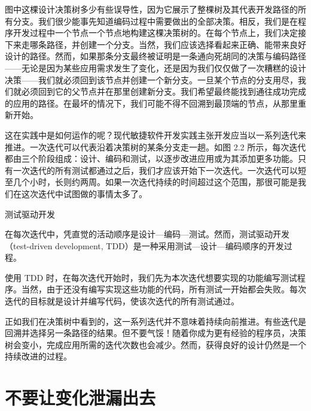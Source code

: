 图中这棵设计决策树多少有些误导性，因为它展示了整棵树及其代表开发路径的所有分支。我们很少能事先知道编码过程中需要做出的全部决策。相反，我们是在程序开发过程中一个节点一个节点地构建这棵决策树的。在每个节点上，我们决定接下来走哪条路径，并创建一个分支。当然，我们应该选择看起来正确、能带来良好设计的路径。然而，如果那条分支最终被证明是一条通向死胡同的决策与编码路径——无论是因为某些应用需求发生了变化，还是因为我们仅仅做了一次糟糕的设计决策——我们就必须回到该节点并创建一个新分支。一旦某个节点的分支用尽，我们就必须回到它的父节点并在那里创建新分支。我们希望最终能找到通往成功完成的应用的路径。在最坏的情况下，我们可能不得不回溯到最顶端的节点，从那里重新开始。

这在实践中是如何运作的呢？现代敏捷软件开发实践主张开发应当以一系列迭代来推进。一次迭代可以代表沿着决策树的某条分支走一趟。如图 2.2 所示，每次迭代都由三个阶段组成：设计、编码和测试，以逐步改进应用或为其添加更多功能。只有一次迭代的所有测试都通过之后，我们才应该开始下一次迭代。一次迭代可以短至几个小时，长则约两周。如果一次迭代持续的时间超过这个范围，那很可能是我们在这次迭代中试图做的事情太多了。


\begin{mySidebar}{测试驱动开发}

在每次迭代中，凭直觉的活动顺序是设计—编码—测试。然而，测试驱动开发（test-driven development, TDD）是一种采用测试—设计—编码顺序的开发过程。

使用 TDD 时，在每次迭代开始时，我们先为本次迭代想要实现的功能编写测试程序。当然，由于还没有编写实现这些功能的代码，所有测试一开始都会失败。每次迭代的目标就是设计并编写代码，使该次迭代的所有测试通过。
\end{mySidebar}

正如我们在决策树中看到的，这一系列迭代并不意味着持续向前推进。有些迭代是回溯并选择另一条路径的结果。但不要气馁！随着你成为更有经验的程序员，决策树会变小，完成应用所需的迭代次数也会减少。然而，获得良好的设计仍然是一个持续改进的过程。


\section{不要让变化泄漏出去}

